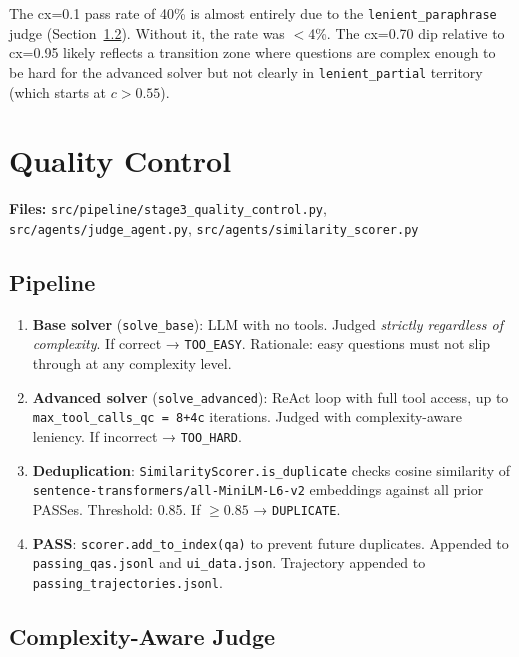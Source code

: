 \documentclass[11pt,a4paper]{article}
\begin{document}
\vspace{0.5em}

The cx=0.1 pass rate of 40\% is almost entirely due to the \texttt{lenient\_paraphrase} judge (Section~\ref{sec:judge}). Without it, the rate was $<$4\%. The cx=0.70 dip relative to cx=0.95 likely reflects a transition zone where questions are complex enough to be hard for the advanced solver but not clearly in \texttt{lenient\_partial} territory (which starts at $c>0.55$).

\section{Quality Control}
\label{sec:qc}

\textbf{Files:} \texttt{src/pipeline/stage3\_quality\_control.py}, \texttt{src/agents/judge\_agent.py}, \texttt{src/agents/similarity\_scorer.py}

\subsection{Pipeline}

\begin{enumerate}[leftmargin=*,noitemsep]
  \item \textbf{Base solver} (\texttt{solve\_base}): LLM with no tools. Judged \emph{strictly regardless of complexity}. If correct → \texttt{TOO\_EASY}. Rationale: easy questions must not slip through at any complexity level.
  \item \textbf{Advanced solver} (\texttt{solve\_advanced}): ReAct loop with full tool access, up to \texttt{max\_tool\_calls\_qc = 8+4c} iterations. Judged with complexity-aware leniency. If incorrect → \texttt{TOO\_HARD}.
  \item \textbf{Deduplication}: \texttt{SimilarityScorer.is\_duplicate} checks cosine similarity of \texttt{sentence-transformers/all-MiniLM-L6-v2} embeddings against all prior PASSes. Threshold: 0.85. If $\geq 0.85$ → \texttt{DUPLICATE}.
  \item \textbf{PASS}: \texttt{scorer.add\_to\_index(qa)} to prevent future duplicates. Appended to \texttt{passing\_qas.jsonl} and \texttt{ui\_data.json}. Trajectory appended to \texttt{passing\_trajectories.jsonl}.
\end{enumerate}

\subsection{Complexity-Aware Judge}
\label{sec:judge}
\end{document}
